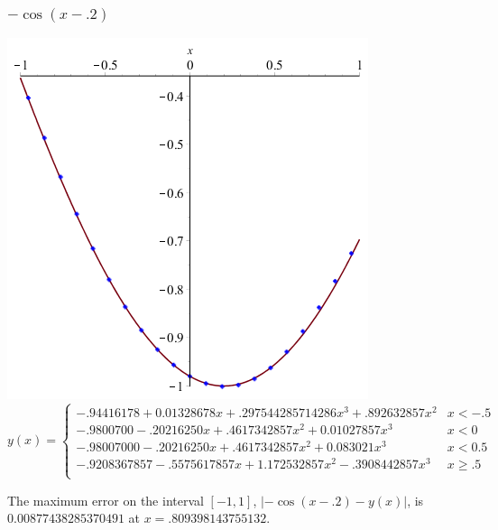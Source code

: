 \documentclass[11pt]{article} %
\begin{document}
\subsubsection*{$-\cos(x-.2)$}
\includegraphics[scale=.3]{plots/dataset1approx.png}
$$
y(x) = \left\{
        \begin{array}{ll}
            -.94416178+0.01328678x+.297544285714286x^3+.892632857x^2 &  x < -.5 \\
            -.9800700-.20216250x+.4617342857x^2+0.01027857x^3 & x < 0 \\
 	-.98007000-.20216250x+.4617342857x^2+0.083021x^3 &  x < 0.5 \\
 	-.9208367857-.5575617857x+1.172532857x^2-.3908442857x^3 &  x \geq .5 \\
        \end{array}
    \right.
$$

The maximum error on the interval $[-1,1]$, $|-\cos(x-.2) - y(x)|$, is $0.00877438285370491$ at $x = .809398143755132$.
\end{document}

